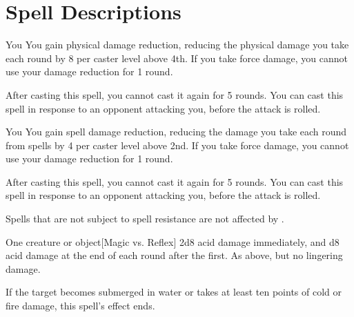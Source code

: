 \section{Spell Descriptions}

\small

\begin{comment}
\subsubsection{A}
\end{comment}

\begin{spelltarget}{You}
    \spelleffect You gain physical damage reduction, reducing the physical damage you take each round by 8  per caster level above 4th. If you take force damage, you cannot use your damage reduction for 1 round.
\end{spelltarget}
\spellnotes After casting this spell, you cannot cast it again for 5 rounds. You can cast this spell in response to an opponent attacking you, before the attack is rolled.

\begin{spelltarget}{You}
    \spelleffect You gain spell damage reduction, reducing the damage you take each round from spells by 4  per caster level above 2nd. If you take force damage, you cannot use your damage reduction for 1 round.
\end{spelltarget}
\spellnotes After casting this spell, you cannot cast it again for 5 rounds. You can cast this spell in response to an opponent attacking you, before the attack is rolled.

Spells that are not subject to spell resistance are not affected by .

\spellrng{\rngmed}
\begin{spelltarget}{One creature or object}[Magic vs. Reflex]
    \spellsuccess 2d8 acid damage immediately, and d8 acid damage at the end of each round after the first.
    \spellfailure As above, but no lingering damage.
\end{spelltarget}
\spellnotes If the target becomes submerged in water or takes at least ten points of cold or fire damage, this spell's effect ends.

